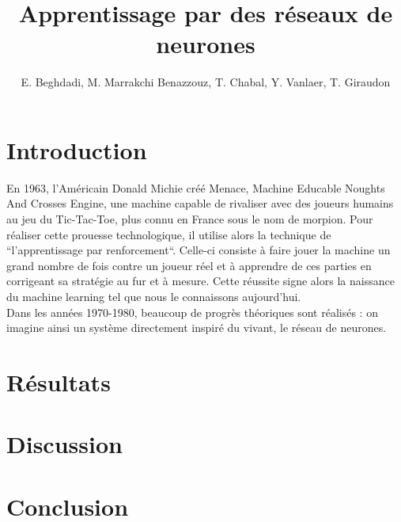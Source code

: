 \documentclass[a4paper,10pt]{article}
\title{Apprentissage par des réseaux de neurones}
\author{E. Beghdadi, M. Marrakchi Benazzouz, T. Chabal, Y. Vanlaer, T. Giraudon}
\begin{document}
\maketitle

\begin{abstract}

\end{abstract}

\section{Introduction}
En 1963, l'Américain Donald Michie créé Menace, Machine Educable Noughts And Crosses Engine, une machine capable de rivaliser avec des joueurs humains
au jeu du Tic-Tac-Toe, plus connu en France sous le nom de morpion.
Pour réaliser cette prouesse technologique, il utilise alors la technique de ``l'apprentissage par renforcement``. Celle-ci consiste à faire jouer la machine un grand
nombre de fois contre un joueur réel et à apprendre de ces parties en corrigeant sa stratégie au fur et à mesure. Cette réussite signe alors la naissance du machine
learning tel que nous le connaissons aujourd'hui. \\
Dans les années 1970-1980, beaucoup de progrès théoriques sont réalisés : on imagine ainsi un système directement inspiré du vivant, le réseau de neurones.
\section{Résultats}

\section{Discussion}

\section{Conclusion}
\end{document}
